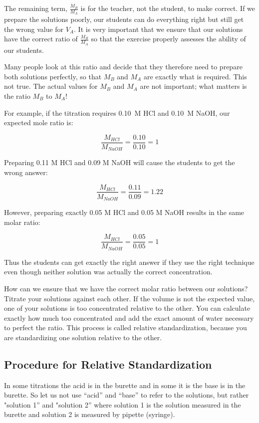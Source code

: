 The remaining term, $ \frac{M_{B}}{M_{A}} $ is for the teacher, not the student, to make correct. If we prepare the solutions poorly, our students can do everything right but still get the wrong value for $ V_{A} $. It is very important that we ensure that our solutions have the correct ratio of $ \frac{M_{B}}{M_{A}} $ so that the exercise properly assesses the ability of our students.

Many people look at this ratio and decide that they therefore need to prepare both solutions perfectly, so that $ M_{B} $ and $ M_{A} $ are exactly what is required. This not true. The actual values for $ M_{B} $ and $ M_{A} $ are not important; what matters is the ratio $ M_{B} $ to $ M_{A} $!

For example, if the titration requires 0.10~M HCl and 0.10~M NaOH, our expected mole ratio is:

\[ \frac{M_{HCl}}{M_{NaOH}} = \frac{0.10}{0.10} = 1 \]

Preparing 0.11 M HCl and 0.09 M NaOH will cause the students to get the wrong answer:

\[ \frac{M_{HCl}}{M_{NaOH}} = \frac{0.11}{0.09} = 1.22 \]

However, preparing exactly 0.05 M HCl and 0.05 M NaOH results in the same molar ratio:

\[ \frac{M_{HCl}}{M_{NaOH}} = \frac{0.05}{0.05} = 1 \]

Thus the students can get exactly the right answer if they use the right technique even though neither solution was actually the correct concentration.

How can we ensure that we have the correct molar ratio between our solutions? Titrate your solutions against each other. If the volume is not the expected value, one of your solutions is too concentrated relative to the other. You can calculate exactly how much too concentrated and add the exact amount of water necessary to perfect the ratio. This process is called relative standardization, because you are standardizing one solution relative to the other.

\subsection{Procedure for Relative Standardization}
\label{sub:relstand}
In some titrations the acid is in the burette and in some it is the base is in the burette. So let us not use ``acid'' and ``base'' to refer to the solutions, but rather "solution 1'' and "solution 2'' where solution 1 is the solution measured in the burette and solution 2 is measured by pipette (syringe).

